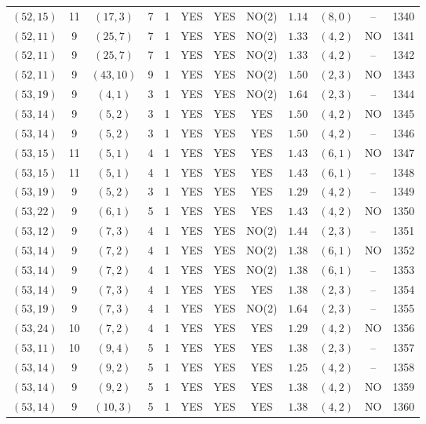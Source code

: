 \begin{longtable}{|c|c|c|c|c|c|c|c|c|c|c|c|}
$(52,15)$ & 11 & $(17,3)$ & 7 & 1 & YES & YES & NO(2) & $1.14$ & $(8,0)$ & -- & 1340\\
$(52,11)$ & 9 & $(25,7)$ & 7 & 1 & YES & YES & NO(2) & $1.33$ & $(4,2)$ & NO & 1341\\
$(52,11)$ & 9 & $(25,7)$ & 7 & 1 & YES & YES & NO(2) & $1.33$ & $(4,2)$ & -- & 1342\\
$(52,11)$ & 9 & $(43,10)$ & 9 & 1 & YES & YES & NO(2) & $1.50$ & $(2,3)$ & NO & 1343\\
$(53,19)$ & 9 & $(4,1)$ & 3 & 1 & YES & YES & NO(2) & $1.64$ & $(2,3)$ & -- & 1344\\
$(53,14)$ & 9 & $(5,2)$ & 3 & 1 & YES & YES & YES & $1.50$ & $(4,2)$ & NO & 1345\\
$(53,14)$ & 9 & $(5,2)$ & 3 & 1 & YES & YES & YES & $1.50$ & $(4,2)$ & -- & 1346\\
$(53,15)$ & 11 & $(5,1)$ & 4 & 1 & YES & YES & YES & $1.43$ & $(6,1)$ & NO & 1347\\
$(53,15)$ & 11 & $(5,1)$ & 4 & 1 & YES & YES & YES & $1.43$ & $(6,1)$ & -- & 1348\\
$(53,19)$ & 9 & $(5,2)$ & 3 & 1 & YES & YES & YES & $1.29$ & $(4,2)$ & -- & 1349\\
$(53,22)$ & 9 & $(6,1)$ & 5 & 1 & YES & YES & YES & $1.43$ & $(4,2)$ & NO & 1350\\
$(53,12)$ & 9 & $(7,3)$ & 4 & 1 & YES & YES & NO(2) & $1.44$ & $(2,3)$ & -- & 1351\\
$(53,14)$ & 9 & $(7,2)$ & 4 & 1 & YES & YES & NO(2) & $1.38$ & $(6,1)$ & NO & 1352\\
$(53,14)$ & 9 & $(7,2)$ & 4 & 1 & YES & YES & NO(2) & $1.38$ & $(6,1)$ & -- & 1353\\
$(53,14)$ & 9 & $(7,3)$ & 4 & 1 & YES & YES & YES & $1.38$ & $(2,3)$ & -- & 1354\\
$(53,19)$ & 9 & $(7,3)$ & 4 & 1 & YES & YES & NO(2) & $1.64$ & $(2,3)$ & -- & 1355\\
$(53,24)$ & 10 & $(7,2)$ & 4 & 1 & YES & YES & YES & $1.29$ & $(4,2)$ & NO & 1356\\
$(53,11)$ & 10 & $(9,4)$ & 5 & 1 & YES & YES & YES & $1.38$ & $(2,3)$ & -- & 1357\\
$(53,14)$ & 9 & $(9,2)$ & 5 & 1 & YES & YES & YES & $1.25$ & $(4,2)$ & -- & 1358\\
$(53,14)$ & 9 & $(9,2)$ & 5 & 1 & YES & YES & YES & $1.38$ & $(4,2)$ & NO & 1359\\
$(53,14)$ & 9 & $(10,3)$ & 5 & 1 & YES & YES & YES & $1.38$ & $(4,2)$ & NO & 1360\\

\end{longtable}

